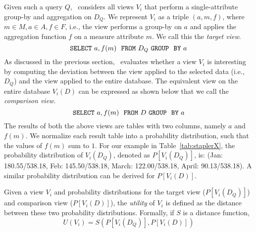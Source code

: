 Given such a query $Q$, \SeeDB\ considers all views $V_i$ that perform a
single-attribute group-by and aggregation on $D_Q$. We represent $V_i$ as a
triple $(a, m, f)$, where $m \in M, a \in A, f \in F$, i.e., the view
performs a group-by on $a$ and applies the aggregation function $f$ on a measure
attribute $m$. We call this the {\em target view}.
$${\tt SELECT \ } a, f(m) \ \ {\tt FROM} \  D_Q\  {\tt GROUP \ \ BY} \ a$$ 
As discussed in the previous section, \SeeDB\ evaluates
whether a view $V_i$ is interesting
by computing the deviation between the view applied to the selected data (i.e., $D_Q$) 
and the view applied to the entire database.
The equivalent view on the entire database $V_i (D)$ can be expressed as shown
below that we call the {\em comparison view}. 
$${\tt SELECT \ } a, f(m) \ \ {\tt FROM} \  D\  {\tt GROUP \ \ BY} \ a$$
The results of both the above views are tables with two columns, namely $a$ and
$f(m)$. We normalize each result table into a probability distribution, such
that the values of $f(m)$ sum to $1$.
For our example in Table~\ref{tab:staplerX}, the probability distribution of
$V_i(D_Q)$, denoted as $P[V_i (D_Q)]$, is: (Jan: 180.55/538.18, Feb:
145.50/538.18, March: 122.00/538.18,  April: 90.13/538.18). A similar
probability distribution can be derived for $P[V_i (D)]$.

Given a view $V_i$ and probability distributions for the
target view  ($P[V_i (D_Q)]$) and comparison view ($P[V_i (D)]$), the
{\em utility} of $V_i$ is defined as the distance between these two probability
distributions. Formally, if $S$ is a distance function,
$$ U (V_i) = S ( P[V_i (D_Q)], P[V_i (D)] )$$

